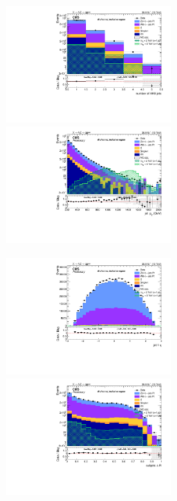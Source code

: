
\begin{figure}[!htb]
  \begin{center}
    \includegraphics[width=0.495\textwidth]{plots/v9_U/XVZnnInc/nFatJets.pdf}  
    \includegraphics[width=0.495\textwidth]{plots/v9_U/XVZnnInc/FatJet1_pt.pdf}
    
    \includegraphics[width=0.495\textwidth]{plots/v9_U/XVZnnInc/FatJet1_eta.pdf}
    \includegraphics[width=0.495\textwidth]{plots/v9_U/XVZnnInc/FatJet1_dR.pdf}


\end{center}
\end{figure}
